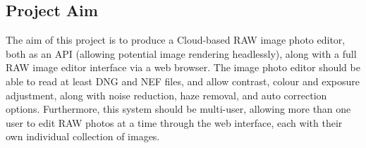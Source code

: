 \documentclass[12pt,a4paper]{article}
\begin{document}




\subsection{Project Aim}
The aim of this project is to produce a Cloud-based RAW image photo editor, both as an API (allowing potential
image rendering headlessly), along with a full RAW image editor interface via a web browser. The image photo editor
should be able to read at least DNG and NEF files, and allow contrast, colour and exposure adjustment, along with
noise reduction, haze removal, and auto correction options. Furthermore, this system should be multi-user, allowing more than
one user to edit RAW photos at a time through the web interface, each with their own individual collection of images.
\end{document}

